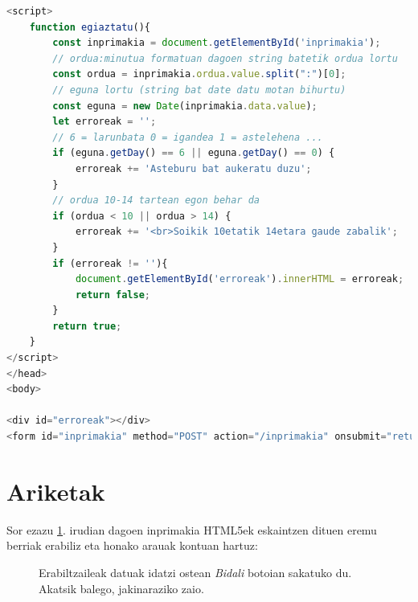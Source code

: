 \clearpage
\begin{lstlisting}[language=JavaScript,caption={Inprimaki baten balioak egiaztatzeko kodea.},captionpos=b]
<script>
    function egiaztatu(){
        const inprimakia = document.getElementById('inprimakia');
        // ordua:minutua formatuan dagoen string batetik ordua lortu
        const ordua = inprimakia.ordua.value.split(":")[0];
        // eguna lortu (string bat date datu motan bihurtu)
        const eguna = new Date(inprimakia.data.value);
        let erroreak = '';
        // 6 = larunbata 0 = igandea 1 = astelehena ...
        if (eguna.getDay() == 6 || eguna.getDay() == 0) {
            erroreak += 'Asteburu bat aukeratu duzu';
        }
        // ordua 10-14 tartean egon behar da
        if (ordua < 10 || ordua > 14) {
            erroreak += '<br>Soikik 10etatik 14etara gaude zabalik';
        }
        if (erroreak != ''){
            document.getElementById('erroreak').innerHTML = erroreak;
            return false;
        }
        return true;
    }
</script>
</head>
<body>

<div id="erroreak"></div>
<form id="inprimakia" method="POST" action="/inprimakia" onsubmit="return egiaztatu();" >
\end{lstlisting}
\label{lst:inprimakiaegiaztatu}

\section{Ariketak}

Sor ezazu \ref{fig:inprimakiak}. irudian dagoen inprimakia HTML5ek eskaintzen dituen eremu berriak erabiliz eta honako arauak kontuan hartuz:

\begin{figure}[ht]
	\centering
{}
\caption{Erabiltzaileak datuak idatzi ostean \textit{Bidali} botoian  sakatuko du. Akatsik balego, jakinaraziko zaio.}
\label{fig:inprimakiak}
\end{figure}

